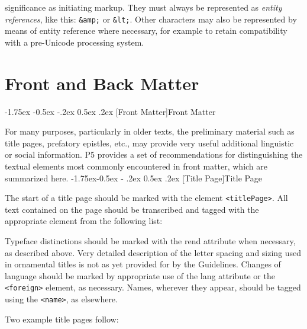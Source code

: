 \documentclass[11pt,twoside]{article}\makeatletter
\makeatletter
\renewcommand\section{\@startsection {section}{1}{\z@}%
     {-1.75ex \@plus -0.5ex \@minus -.2ex}%
     {0.5ex \@plus .2ex}%
     {\reset@font\Large\bfseries\sffamily}}
\renewcommand\subsection{\@startsection{subsection}{2}{\z@}%
     {-1.75ex\@plus -0.5ex \@minus- .2ex}%
     {0.5ex \@plus .2ex}%
     {\reset@font\Large\sffamily}}
\renewcommand\subsubsection{\@startsection{subsubsection}{3}{\z@}%
     {-1.5ex\@plus -0.35ex \@minus -.2ex}%
     {0.5ex \@plus .2ex}%
     {\reset@font\large\sffamily}}
\def\DivI{\section}
\def\DivII{\subsection}
\def\DivIII{\subsubsection}
\def\DivI{\chapter}
\def\DivII{\section}
\def\DivIII{\subsection}
\makeatother
\begin{document}
significance as initiating markup. They must always be represented as
\emph{entity references}, like this: \texttt{&amp;} or
\texttt{&lt;}. Other characters may also be represented by
means of entity reference where necessary, for example to retain
compatibility with a pre-Unicode processing system. 
\DivI[Front and Back Matter]{Front and Back Matter}\label{U5-fronbac}
\DivII[Front Matter]{Front Matter}\par For many purposes, particularly in older texts, the preliminary
material such as title pages, prefatory epistles, etc., may provide
very useful additional linguistic or social information. P5 provides a
set of recommendations for distinguishing the textual elements most
commonly encountered in front matter, which are summarized
      here.
\DivIII[Title Page]{Title Page}\label{h51}\par The start of a title page should be marked with the element
\texttt{<titlePage>}.  All text contained on the page should be
transcribed and tagged with the appropriate element from the following
list:
\par Typeface distinctions should be marked with the rend
attribute when necessary, as described above. Very detailed
description of the letter spacing and sizing used in ornamental titles
is not as yet provided for by the Guidelines. Changes of language
should be marked by appropriate use of the lang
attribute or the
\texttt{<foreign>} element, as necessary. Names, wherever they appear,
should be tagged using the \texttt{<name>}, as elsewhere.\par Two example title pages follow:
\end{document}
